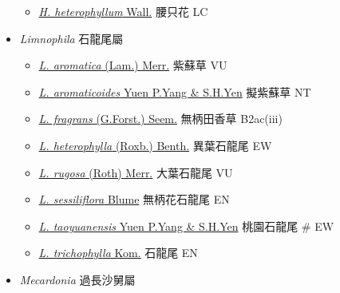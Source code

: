 \begin{itemize}
  \begin{itemize}
        \item[] \href{http://www.theplantlist.org/tpl1.1/search?q=Hemiphragma+heterophyllum}{\textit{H. heterophyllum} Wall.}   腰只花   LC
  \end{itemize}
 \item[] \textit{Limnophila} 石龍尾屬
                                
  \begin{itemize}
        \item[] \href{http://www.theplantlist.org/tpl1.1/search?q=Limnophila+aromatica}{\textit{L. aromatica} (Lam.) Merr.}   紫蘇草   VU
        \item[] \href{http://www.theplantlist.org/tpl1.1/search?q=Limnophila+aromaticoides}{\textit{L. aromaticoides} Yuen P.Yang \& S.H.Yen}   擬紫蘇草   NT
        \item[] \href{http://www.theplantlist.org/tpl1.1/search?q=Limnophila+fragrans}{\textit{L. fragrans} (G.Forst.) Seem.}   無柄田香草   B2ac(iii)
        \item[] \href{http://www.theplantlist.org/tpl1.1/search?q=Limnophila+heterophylla}{\textit{L. heterophylla} (Roxb.) Benth.}   異葉石龍尾   EW
        \item[] \href{http://www.theplantlist.org/tpl1.1/search?q=Limnophila+rugosa}{\textit{L. rugosa} (Roth) Merr.}   大葉石龍尾   VU
        \item[] \href{http://www.theplantlist.org/tpl1.1/search?q=Limnophila+sessiliflora}{\textit{L. sessiliflora} Blume}   無柄花石龍尾   EN
        \item[] \href{http://www.theplantlist.org/tpl1.1/search?q=Limnophila+taoyuanensis}{\textit{L. taoyuanensis} Yuen P.Yang \& S.H.Yen}   桃園石龍尾  \# EW
        \item[] \href{http://www.theplantlist.org/tpl1.1/search?q=Limnophila+trichophylla}{\textit{L. trichophylla} Kom.}   石龍尾   EN
  \end{itemize}
 \item[] \textit{Mecardonia} 過長沙舅屬
                                

\end{itemize}

